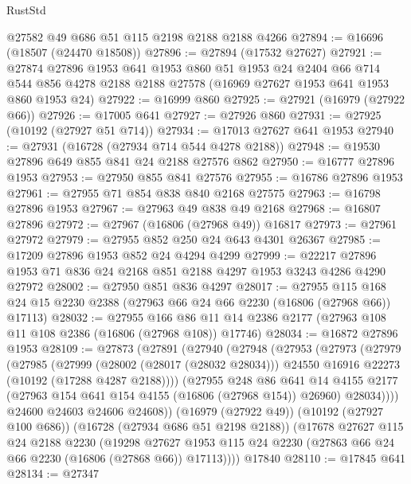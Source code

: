 \begin{lexlean}{RustStd}
\begin{coremodule}
    @27582
    @49
    @686
    @51
    @115
    @2198
    @2188
    @2188
    @4266
@27894 := @16696 (@18507 (@24470 @18508))
@27896 := @27894 (@17532 @27627)
@27921 := @27874
    @27896
    @1953
    @641
    @1953
    @860
    @51
    @1953
    @24
    @2404
    @66
    @714
    @544
    @856
    @4278
    @2188
    @2188
    @27578
    (@16969 @27627 @1953 @641 @1953 @860 @1953 @24)
@27922 := @16999 @860
@27925 := @27921 (@16979 (@27922 @66))
@27926 := @17005 @641
@27927 := @27926 @860
@27931 := @27925 (@10192 (@27927 @51 @714))
@27934 := @17013 @27627 @641 @1953
@27940 := @27931 (@16728 (@27934 @714 @544 @4278 @2188))
@27948 := @19530 @27896 @649 @855 @841 @24 @2188 @27576 @862
@27950 := @16777 @27896 @1953
@27953 := @27950 @855 @841 @27576
@27955 := @16786 @27896 @1953
@27961 := @27955 @71 @854 @838 @840 @2168 @27575
@27963 := @16798 @27896 @1953
@27967 := @27963 @49 @838 @49 @2168
@27968 := @16807 @27896
@27972 := @27967 (@16806 (@27968 @49)) @16817
@27973 := @27961 @27972
@27979 := @27955 @852 @250 @24 @643 @4301 @26367
@27985 := @17209 @27896 @1953 @852 @24 @4294 @4299
@27999 := @22217 @27896 @1953 @71 @836 @24 @2168 @851 @2188 @4297 @1953 @3243 @4286 @4290 @27972
@28002 := @27950 @851 @836 @4297
@28017 := @27955
    @115
    @168
    @24
    @15
    @2230
    @2388
    (@27963 @66 @24 @66 @2230 (@16806 (@27968 @66)) @17113)
@28032 := @27955
    @166
    @86
    @11
    @14
    @2386
    @2177
    (@27963 @108 @11 @108 @2386 (@16806 (@27968 @108)) @17746)
@28034 := @16872 @27896 @1953
@28109 := @27873
    (@27891
      (@27940
        (@27948
          (@27953
            (@27973
              (@27979
                (@27985
                  (@27999
                    (@28002 (@28017 (@28032 @28034)))
                    @24550
                    @16916
                    @22273
                    (@10192 (@17288 @4287 @2188))))
                (@27955
                  @248
                  @86
                  @641
                  @14
                  @4155
                  @2177
                  (@27963 @154 @641 @154 @4155 (@16806 (@27968 @154)) @26960)
                  @28034))))
          @24600
          @24603
          @24606
          @24608))
      (@16979 (@27922 @49))
      (@10192 (@27927 @100 @686))
      (@16728 (@27934 @686 @51 @2198 @2188))
      (@17678
        @27627
        @115
        @24
        @2188
        @2230
        (@19298
          @27627
          @1953
          @115
          @24
          @2230
          (@27863 @66 @24 @66 @2230 (@16806 (@27868 @66)) @17113))))
    @17840
@28110 := @17845 @641
@28134 := @27347

\end{coremodule}
\end{lexlean}

